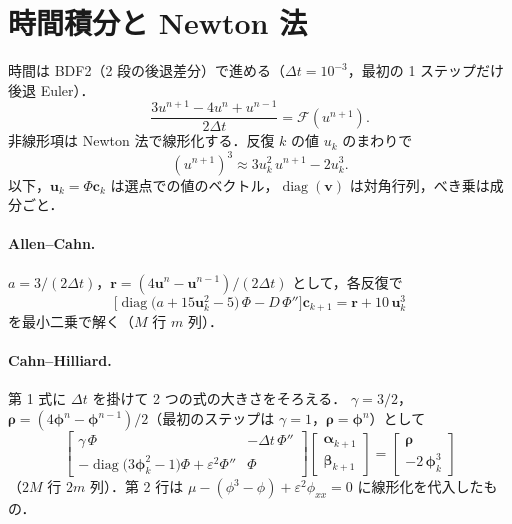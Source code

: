 \documentclass[uplatex,dvipdfmx,a4paper,11pt]{jsarticle}
\begin{document}
\section{時間積分と Newton 法}
時間は BDF2（2 段の後退差分）で進める（$\Delta t=10^{-3}$，最初の 1 ステップだけ後退 Euler）．
\begin{equation}
  \frac{3u^{n+1}-4u^{n}+u^{n-1}}{2\Delta t} = \mathcal{F}(u^{n+1}).
\end{equation}
非線形項は Newton 法で線形化する．反復 $k$ の値 $u_k$ のまわりで
\begin{equation}
  (u^{n+1})^3\approx 3u_k^2\,u^{n+1}-2u_k^3 .
\end{equation}
以下，$\bm u_k=\Phi\bm c_k$ は選点での値のベクトル，$\operatorname{diag}(\bm v)$ は対角行列，べき乗は成分ごと．

\paragraph{Allen--Cahn.}
$a=3/(2\Delta t)$，$\bm r=(4\bm u^{n}-\bm u^{n-1})/(2\Delta t)$ として，各反復で
\begin{equation}
  \Big[\operatorname{diag}\big(a+15\bm u_k^2-5\big)\,\Phi - D\,\Phi''\Big]\bm c_{k+1} = \bm r + 10\,\bm u_k^3
  \label{eq:ac-ls}
\end{equation}
を最小二乗で解く（$M$ 行 $m$ 列）．

\paragraph{Cahn--Hilliard.}
第 1 式に $\Delta t$ を掛けて 2 つの式の大きさをそろえる．
$\gamma=3/2$，$\bm\rho=(4\bm\phi^{n}-\bm\phi^{n-1})/2$（最初のステップは $\gamma=1$，$\bm\rho=\bm\phi^{n}$）として
\begin{equation}
  \begin{bmatrix}
    \gamma\,\Phi & -\Delta t\,\Phi''\\[2pt]
    -\operatorname{diag}\big(3\bm\phi_k^2-1\big)\Phi+\varepsilon^2\Phi'' & \Phi
  \end{bmatrix}
  \begin{bmatrix}\bm\alpha_{k+1}\\ \bm\beta_{k+1}\end{bmatrix}
  =
  \begin{bmatrix}\bm\rho\\ -2\,\bm\phi_k^3\end{bmatrix}
  \label{eq:ch-ls}
\end{equation}
（$2M$ 行 $2m$ 列）．第 2 行は $\mu-(\phi^3-\phi)+\varepsilon^2\phi_{xx}=0$ に線形化を代入したもの．
\end{document}
